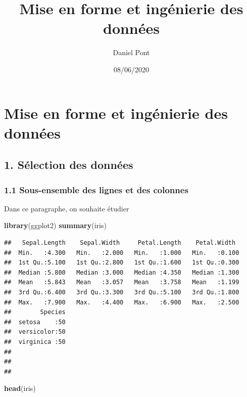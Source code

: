 \documentclass[
]{article}
\title{Mise en forme et ingénierie des données}
\author{Daniel Pont}
\date{08/06/2020}
\newenvironment{Shaded}{\begin{snugshade}}{\end{snugshade}}
\newcommand{\KeywordTok}[1]{\textcolor[rgb]{0.13,0.29,0.53}{\textbf{#1}}}
\newcommand{\NormalTok}[1]{#1}
\begin{document}
\maketitle

{
\setcounter{tocdepth}{2}
\tableofcontents
}
\hypertarget{mise-en-forme-et-inguxe9nierie-des-donnuxe9es}{%
\section{Mise en forme et ingénierie des
données}\label{mise-en-forme-et-inguxe9nierie-des-donnuxe9es}}

\hypertarget{suxe9lection-des-donnuxe9es}{%
\subsection{1. Sélection des
données}\label{suxe9lection-des-donnuxe9es}}

\hypertarget{sous-ensemble-des-lignes-et-des-colonnes}{%
\subsubsection{1.1 Sous-ensemble des lignes et des
colonnes}\label{sous-ensemble-des-lignes-et-des-colonnes}}

Dans ce paragraphe, on souhaite étudier

\begin{Shaded}
\begin{Highlighting}[]
\KeywordTok{library}\NormalTok{(ggplot2)}
\KeywordTok{summary}\NormalTok{(iris)}
\end{Highlighting}
\end{Shaded}

\begin{verbatim}
##   Sepal.Length    Sepal.Width     Petal.Length    Petal.Width   
##  Min.   :4.300   Min.   :2.000   Min.   :1.000   Min.   :0.100  
##  1st Qu.:5.100   1st Qu.:2.800   1st Qu.:1.600   1st Qu.:0.300  
##  Median :5.800   Median :3.000   Median :4.350   Median :1.300  
##  Mean   :5.843   Mean   :3.057   Mean   :3.758   Mean   :1.199  
##  3rd Qu.:6.400   3rd Qu.:3.300   3rd Qu.:5.100   3rd Qu.:1.800  
##  Max.   :7.900   Max.   :4.400   Max.   :6.900   Max.   :2.500  
##        Species  
##  setosa    :50  
##  versicolor:50  
##  virginica :50  
##                 
##                 
## 
\end{verbatim}

\begin{Shaded}
\begin{Highlighting}[]
\KeywordTok{head}\NormalTok{(iris)}
\end{Highlighting}
\end{Shaded}
\end{document}
